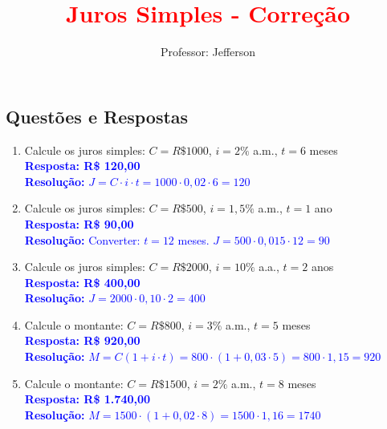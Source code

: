 \documentclass[11pt]{article}
\title{\textbf{\textcolor{red}{Juros Simples - Correção}}}
\author{Professor: Jefferson}
\date{}
\begin{document}
\maketitle
\vspace{-0.5cm}

\begin{multicols}{2}

\section*{Questões e Respostas}

\begin{enumerate}[leftmargin=*, itemsep=2pt]

\item Calcule os juros simples: $C = R\$ 1000$, $i = 2\%$ a.m., $t = 6$ meses \\
\textcolor{blue}{\textbf{Resposta: R\$ 120,00}} \\
\textcolor{blue}{\textbf{Resolução:} $J = C \cdot i \cdot t = 1000 \cdot 0,02 \cdot 6 = 120$}

\item Calcule os juros simples: $C = R\$ 500$, $i = 1,5\%$ a.m., $t = 1$ ano \\
\textcolor{blue}{\textbf{Resposta: R\$ 90,00}} \\
\textcolor{blue}{\textbf{Resolução:} Converter: $t = 12$ meses. $J = 500 \cdot 0,015 \cdot 12 = 90$}

\item Calcule os juros simples: $C = R\$ 2000$, $i = 10\%$ a.a., $t = 2$ anos \\
\textcolor{blue}{\textbf{Resposta: R\$ 400,00}} \\
\textcolor{blue}{\textbf{Resolução:} $J = 2000 \cdot 0,10 \cdot 2 = 400$}

\item Calcule o montante: $C = R\$ 800$, $i = 3\%$ a.m., $t = 5$ meses \\
\textcolor{blue}{\textbf{Resposta: R\$ 920,00}} \\
\textcolor{blue}{\textbf{Resolução:} $M = C(1 + i \cdot t) = 800 \cdot (1 + 0,03 \cdot 5) = 800 \cdot 1,15 = 920$}

\item Calcule o montante: $C = R\$ 1500$, $i = 2\%$ a.m., $t = 8$ meses \\
\textcolor{blue}{\textbf{Resposta: R\$ 1.740,00}} \\
\textcolor{blue}{\textbf{Resolução:} $M = 1500 \cdot (1 + 0,02 \cdot 8) = 1500 \cdot 1,16 = 1740$}


\end{enumerate}
\end{multicols}
\end{document}
